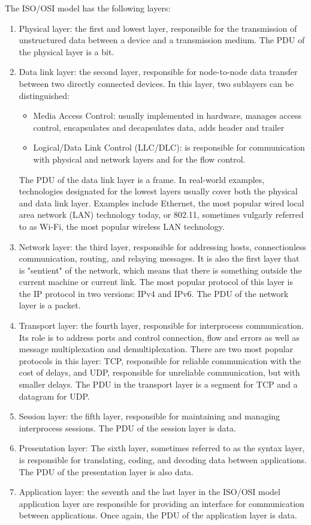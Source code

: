 The ISO/OSI model has the following layers:
\begin{enumerate}
    \item Physical layer: the first and lowest layer, responsible for the transmission of unstructured data between a device and a transmission medium. The PDU of the physical layer is a bit.
    \item Data link layer: the second layer, responsible for node-to-node data transfer between two directly connected devices. In this layer, two sublayers can be distinguished:
    \begin{itemize}
        \item Media Access Control: usually implemented in hardware, manages access control, encapsulates and decapsulates data, adds header and trailer
        \item Logical/Data Link Control (LLC/DLC): is responsible for communication with physical and network layers and for the flow control.
    \end{itemize}
    The PDU of the data link layer is a frame.
    In real-world examples, technologies designated for the lowest layers usually cover both the physical and data link layer. Examples include Ethernet, the most popular wired local area network (LAN) technology today, or 802.11, sometimes vulgarly referred to as Wi-Fi, the most popular wireless LAN technology.
    \item Network layer: the third layer, responsible for addressing hosts, connectionless communication, routing, and relaying messages. It is also the first layer that is "sentient" of the network, which means that there is something outside the current machine or current link. The most popular protocol of this layer is the IP protocol in two versions: IPv4 and IPv6. The PDU of the network layer is a packet.
    \item Transport layer: the fourth layer, responsible for interprocess communication. Its role is to address ports and control connection, flow and errors as well as message multiplexation and demultiplexation. There are two most popular protocols in this layer: TCP, responsible for reliable communication with the cost of delays, and UDP, responsible for unreliable communication, but with smaller delays. The PDU in the transport layer is a segment for TCP and a datagram for UDP.
    \item Session layer: the fifth layer, responsible for maintaining and managing interprocess sessions. The PDU of the session layer is data.
    \item Presentation layer: The sixth layer, sometimes referred to as the syntax layer, is responsible for translating, coding, and decoding data between applications. The PDU of the presentation layer is also data.
    \item Application layer: the seventh and the last layer in the ISO/OSI model application layer are responsible for providing an interface for communication between applications. Once again, the PDU of the application layer is data.
\end{enumerate}
